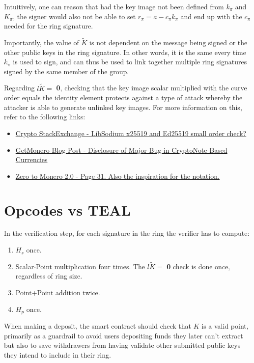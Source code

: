 \documentclass[9pt]{article}
\begin{document}
Intuitively, one can reason that had the key image not been defined from $k_\pi$ and $K_\pi$, the signer would also not be able to set $r_\pi = a - c_\pi k_\pi$ and end up with the $c_\pi$ needed for the ring signature.

Importantly, the value of $\tilde{K}$ is not dependent on the message being signed or the other public keys in the ring signature. In other words, it is the same every time $k_\pi$ is used to sign, and can thus be used to link together multiple ring signatures signed by the same member of the group.

Regarding $l\tilde{K} =$ \textbf{0}, checking that the key image scalar multiplied with the curve order equals the identity element protects against a type of attack whereby the attacker is able to generate unlinked key images. 
For more information on this, refer to the following links: 

\begin{itemize}
    \item \href{https://crypto.stackexchange.com/questions/55632/libsodium-x25519-and-ed25519-small-order-check}{Crypto StackExchange - LibSodium x25519 and Ed25519 small order check?}
    \item \href{https://web.getmonero.org/2017/05/17/disclosure-of-a-major-bug-in-cryptonote-based-currencies.html}{GetMonero Blog Post - Disclosure of Major Bug in CryptoNote Based Currencies}
    \item \href{https://web.getmonero.org/library/Zero-to-Monero-2-0-0.pdf}{Zero to Monero 2.0 - Page 31. Also the inspiration for the notation.}
\end{itemize}


\section{Opcodes vs TEAL}

In the verification step, for each signature in the ring the verifier has to compute:
\begin{enumerate}
    \item $H_s$ once.
    \item Scalar$\cdot$Point multiplication four times. The $l\tilde{K} =$ \textbf{0} check is done once, regardless of ring size.    
    \item Point+Point addition twice.
    \item $H_p$ once.
\end{enumerate}

When making a deposit, the smart contract should check that $K$ is a valid point, primarily as a guardrail to avoid users depositing funds they later can't extract but also to save withdrawers from having validate other submitted public keys they intend to include in their ring.
\end{document}
